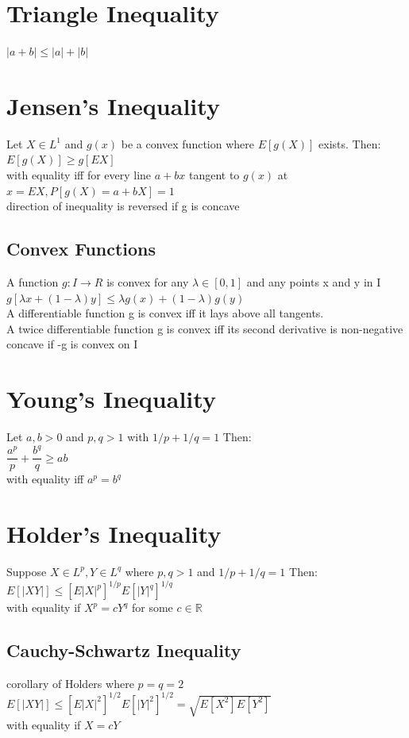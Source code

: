 \documentclass[openany]{book}
\begin{document}
\begin{flushleft}
\section{Triangle Inequality}
$|a+b|\leq |a|+|b|$\\
\section{Jensen's Inequality}
Let $X \in L^1$ and $g(x)$ be a convex function where $E[g(X)]$ exists. Then:\\
$E[g(X)]\geq g[EX]$\\
with equality iff for every line $a+bx$ tangent to $g(x)$ at $x=EX, P[g(X)=a+bX]=1$\\
direction of inequality is reversed if g is concave\\
\subsection{Convex Functions}
A function $g: I\to R$ is convex for any $\lambda \in [0,1]$ and any points x and y in I\\
$g[\lambda x+(1-\lambda)y]\leq \lambda g(x)+(1-\lambda)g(y)$\\
A differentiable function g is convex iff it lays above all tangents.\\
A twice differentiable function g is convex iff its second derivative is non-negative\\
concave if -g is convex on I
\section{Young's Inequality}
Let $a,b >0$ and $p,q>1$ with $1/p+1/q=1$ Then:\\
$\dfrac{a^p}{p}+\dfrac{b^q}{q}\geq ab$\\
with equality iff $a^p=b^q$
\section{Holder's Inequality}
Suppose $X \in L^p, Y \in L^q$ where $p,q>1$ and $1/p+1/q=1$ Then:\\
$E[|XY|]\leq [E|X|^p]^{1/p}E[|Y|^q]^{1/q}$\\
with equality if $X^p=cY^q$ for some $c \in \mathbb{R}$
\subsection{Cauchy-Schwartz Inequality}
corollary of Holders where $p=q=2$\\
$E[|XY|]\leq [E|X|^2]^{1/2}E[|Y|^2]^{1/2}=\sqrt{E[X^2]E[Y^2]}$\\
with equality if $X=cY$

\end{flushleft}
\end{document}
